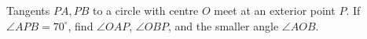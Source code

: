 Tangents $PA,PB$ to a circle with centre $O$ meet at an exterior point $P$. If $\angle APB=70^\circ$, find $\angle OAP$, $\angle OBP$, and the smaller angle $\angle AOB$.
